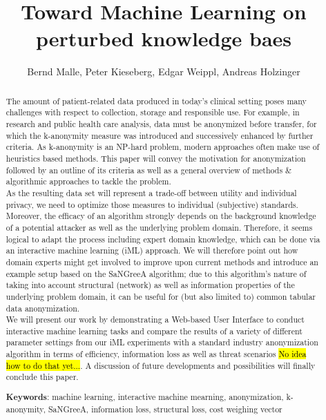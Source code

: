 \documentclass{llncs}
\begin{document}
\title{Toward Machine Learning on perturbed knowledge baes}

\author{Bernd Malle, Peter Kieseberg, Edgar Weippl, Andreas Holzinger}

\maketitle

\begin{abstract}
	
The amount of patient-related data produced in today’s clinical setting poses many challenges with respect to collection, storage and responsible use. For example, in research and public health care analysis, data must be anonymized before transfer, for which the k-anonymity measure was introduced and successively enhanced by further criteria. As k-anonymity is an NP-hard problem, modern approaches often make use of heuristics based methods. This paper will convey the motivation for anonymization followed by an outline of its criteria as well as a general overview of methods \& algorithmic approaches to tackle the problem. \\

As the resulting data set will represent a trade-off between utility and individual privacy, we need to optimize those measures to individual (subjective) standards. Moreover, the efficacy of an algorithm strongly depends on the background knowledge of a potential attacker as well as the underlying problem domain. Therefore, it seems logical to adapt the process including expert domain knowledge, which can be done via an interactive machine learning (iML) approach. We will therefore point out how domain experts might get involved to improve upon current methods and introduce an example setup based on the SaNGreeA algorithm; due to this algorithm's nature of taking into account structural (network) as well as information properties of the underlying problem domain, it can be useful for (but also limited to) common tabular data anonymization. \\

We will present our work by demonstrating a Web-based User Interface to conduct interactive machine learning tasks and compare the results of a variety of different parameter settings from our iML experiments with a standard industry anonymization algorithm in terms of efficiency, information loss as well as threat scenarios \hl{No idea how to do that yet...}. A discussion of future developments and possibilities will finally conclude this paper.


\medskip

\textbf{Keywords}: machine learning, interactive machine mearning, anonymization, k-anonymity, SaNGreeA, information loss, structural loss, cost weighing vector


\end{abstract}
\end{document}
